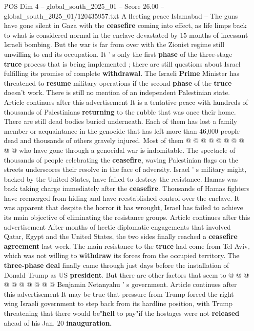 \begin{textsample}{POS Dim 4 – global\_south\_2025\_01 – Score 26.00 – global\_south\_2025\_01/120435957.txt}  \label{ex:f4_pos_016}
A fleeting peace Islamabad -- The guns have gone silent in Gaza with the \textbf{ceasefire} coming into effect, as life limps back to what is considered normal in the enclave devastated by 15 months of incessant Israeli bombing.
But the war is far from over with the Zionist regime still unwilling to end its occupation.
It ' s only the first \textbf{phase} of the three-stage \textbf{truce} process that is being implemented ; there are still questions about Israel fulfilling its promise of complete \textbf{withdrawal}.
The Israeli \textbf{Prime} Minister has threatened to \textbf{resume} military operations if the second \textbf{phase} of the \textbf{truce} doesn't work.
There is still no mention of an independent Palestinian state.
Article continues after this advertisement It is a tentative peace with hundreds of thousands of Palestinians \textbf{returning} to the rubble that was once their home.
There are still dead bodies buried underneath.
Each of them has lost a family member or acquaintance in the genocide that has left more than 46,000 people dead and thousands of others gravely injured.
Most of them @ @ @ @ @ @ @ @ @ @ who have gone through a genocidal war is indomitable.
The spectacle of thousands of people celebrating the \textbf{ceasefire}, waving Palestinian flags on the streets underscores their resolve in the face of adversity.
Israel ' s military might, backed by the United States, have failed to destroy the resistance.
Hamas was back taking charge immediately after the \textbf{ceasefire}.
Thousands of Hamas fighters have reemerged from hiding and have reestablished control over the enclave.
It was apparent that despite the horror it has wrought, Israel has failed to achieve its main objective of eliminating the resistance groups.
Article continues after this advertisement After months of hectic diplomatic engagements that involved Qatar, Egypt and the United States, the two sides finally reached a \textbf{ceasefire} \textbf{agreement} last week.
The main resistance to the \textbf{truce} had come from Tel Aviv, which was not willing to \textbf{withdraw} its forces from the occupied territory.
The \textbf{three-phase} \textbf{deal} finally came through just days before the installation of Donald Trump as US \textbf{president}.
But there are other factors that seem to @ @ @ @ @ @ @ @ @ @ Benjamin Netanyahu ' s government.
Article continues after this advertisement It may be true that pressure from Trump forced the right-wing Israeli government to step back from its hardline position, with Trump threatening that there would be"\textbf{hell} to pay"if the hostages were not \textbf{released} ahead of his Jan. 20 \textbf{inauguration}.

\end{textsample}
